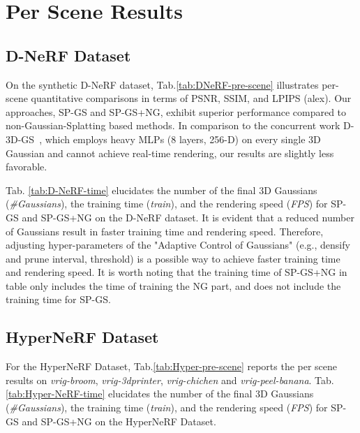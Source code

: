 \section{Per Scene Results} \label{sec-ap:results}

\subsection{D-NeRF Dataset} \label{sec-ap:DNeRF-results}
On the synthetic D-NeRF dataset, Tab.\ref{tab:DNeRF-pre-scene} illustrates per-scene quantitative comparisons in terms of PSNR, SSIM, and LPIPS (alex). Our approaches, SP-GS and SP-GS+NG, exhibit superior performance compared to non-Gaussian-Splatting based methods. In comparison to the concurrent work D-3D-GS~\cite{Deformable3DGS}, which employs heavy MLPs (8 layers, 256-D) on every single 3D Gaussian and cannot achieve real-time rendering, our results are slightly less favorable.

Tab. \ref{tab:D-NeRF-time} elucidates the number of the final 3D Gaussians (\textit{\#Gaussians}), the training time (\textit{train}), and the rendering speed (\textit{FPS}) for SP-GS and SP-GS+NG on the D-NeRF dataset. It is evident that a reduced number of Gaussians result in faster training time and rendering speed. Therefore, adjusting hyper-parameters of the "Adaptive Control of Gaussians" (e.g., densify and prune interval, threshold) is a possible way to achieve faster training time and rendering speed. 
It is worth noting that the training time of SP-GS+NG in table only includes the time of training the NG part, and does not include the training time for SP-GS.

\subsection{HyperNeRF Dataset}  \label{sec-ap:HyperNeRF-results}
For the HyperNeRF Dataset, Tab.\ref{tab:Hyper-pre-scene} reports the per scene results on \textit{vrig-broom}, \textit{vrig-3dprinter}, \textit{vrig-chichen} and \textit{vrig-peel-banana}. Tab. \ref{tab:Hyper-NeRF-time} elucidates the number of the final 3D Gaussians (\textit{\#Gaussians}), the training time (\textit{train}), and the rendering speed (\textit{FPS}) for SP-GS and SP-GS+NG on the HyperNeRF Dataset.

